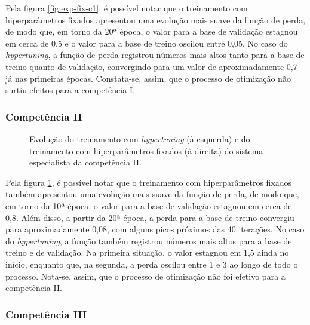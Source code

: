 Pela figura \ref{fig:exp-fix-c1}, é possível notar que o treinamento com hiperparâmetros fixados apresentou uma evolução mais suave da função de perda, de modo que, em torno da 20ª época, o valor para a base de validação estagnou em cerca de 0,5 e o valor para a base de treino oscilou entre 0,05. No caso do \textit{hypertuning}, a função de perda registrou números mais altos tanto para a base de treino quanto de validação, convergindo para um valor de aproximadamente 0,7 já nas primeiras épocas. Constata-se, assim, que o processo de otimização não surtiu efeitos para a competência I.

\subsubsection{Competência II}
\label{subsec:exp-fix-c2}

\begin{figure}[H]
    \begin{minipage}{0.45\textwidth}
        \resizebox{\textwidth}{!}{}
    \end{minipage}
    \begin{minipage}{0.45\textwidth}
        \resizebox{\textwidth}{!}{}
    \end{minipage}

    \caption{Evolução do treinamento com \textit{hypertuning} (à esquerda) e do treinamento com hiperparâmetros fixados (à direita) do sistema especialista da competência II.}
    \label{fig:exp-fix-c2}
\end{figure}

Pela figura \ref{fig:exp-fix-c2}, é possível notar que o treinamento com hiperparâmetros fixados também apresentou uma evolução mais suave da função de perda, de modo que, em torno da 10ª época, o valor para a base de validação estagnou em cerca de 0,8. Além disso, a partir da 20ª época, a perda para a base de treino convergiu para aproximadamente 0,08, com alguns picos próximos das 40 iterações. No caso do \textit{hypertuning}, a função também registrou números mais altos para a base de treino e de validação. Na primeira situação, o valor estagnou em 1,5 ainda no início, enquanto que, na segunda, a perda oscilou entre 1 e 3 ao longo de todo o processo. Nota-se, assim, que o processo de otimização não foi efetivo para a competência II.


\subsubsection{Competência III}
\label{subsec:exp-fix-c3}

